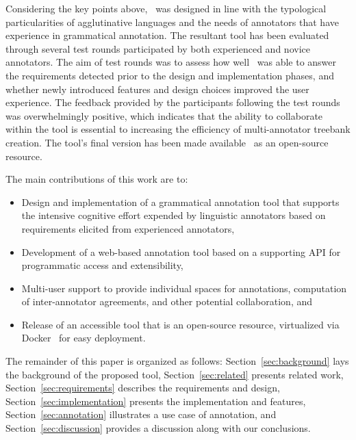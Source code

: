Considering the key points above, \boatvtwo\ was designed in line with the typological particularities of agglutinative languages and the needs of annotators that have experience in grammatical annotation.
The resultant tool has been evaluated through several test rounds participated by both experienced and novice annotators.
The aim of test rounds was to assess how well \boatvtwo\ was able to answer the requirements detected prior to the design and implementation phases, and whether newly introduced features and design choices improved the user experience.
The feedback provided by the participants following the test rounds was overwhelmingly positive, which indicates that the ability to collaborate within the tool is essential to increasing the efficiency of multi-annotator treebank creation.
The tool's final version has been made available~\cite{anon} as an open-source resource.

The main contributions of this work are to:
\begin{itemize}
\setlength\itemsep{0em}
        \item Design and implementation of a grammatical annotation tool that supports the intensive cognitive effort expended by linguistic annotators based on requirements elicited from experienced annotators,
        \item Development of a web-based annotation tool based on a supporting API for programmatic access and extensibility,
        \item Multi-user support to provide individual spaces for annotations, computation of inter-annotator agreements, and other potential collaboration, and
        \item Release of an accessible tool that is an open-source resource, virtualized via Docker~\cite{docker} for easy deployment.
\end{itemize}

The remainder of this paper is organized as follows:
Section~\ref{sec:background} lays the background of the proposed tool,
Section~\ref{sec:related} presents related work,
Section~\ref{sec:requirements} describes the requirements and design,
Section~\ref{sec:implementation} presents the implementation and features,
Section~\ref{sec:annotation} illustrates a use case of annotation, and
Section~\ref{sec:discussion} provides a discussion along with our conclusions.
